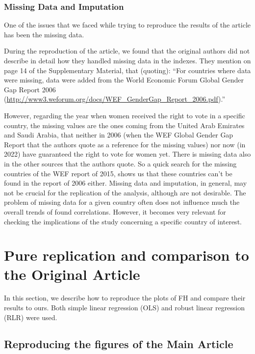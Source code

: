 \documentclass[
]{article}
\begin{document}
\hypertarget{missing-data-and-imputation}{%
\subsubsection{Missing Data and
Imputation}\label{missing-data-and-imputation}}

One of the issues that we faced while trying to reproduce the results of
the article has been the missing data.

During the reproduction of the article, we found that the original
authors did not describe in detail how they handled missing data in the
indexes. They mention on page 14 of the Supplementary Material, that
(quoting): ``For countries where data were missing, data were added from
the World Economic Forum Global Gender Gap Report 2006
(\url{http://www3.weforum.org/docs/WEF_GenderGap_Report_2006.pdf}).''

However, regarding the year when women received the right to vote in a
specific country, the missing values are the ones coming from the United
Arab Emirates and Saudi Arabia, that neither in 2006 (when the WEF
Global Gender Gap Report that the authors quote as a reference for the
missing values) nor now (in 2022) have guaranteed the right to vote for
women yet. There is missing data also in the other sources that the
authors quote. So a quick search for the missing countries of the WEF
report of 2015, shows us that these countries can't be found in the
report of 2006 either. Missing data and imputation, in general, may not
be crucial for the replication of the analysis, although are not
desirable. The problem of missing data for a given country often does
not influence much the overall trends of found correlations. However, it
becomes very relevant for checking the implications of the study
concerning a specific country of interest.

\hypertarget{pure-replication-and-comparison-to-the-original-article}{%
\section{Pure replication and comparison to the Original
Article}\label{pure-replication-and-comparison-to-the-original-article}}

In this section, we describe how to reproduce the plots of FH and
compare their results to ours. Both simple linear regression (OLS) and
robust linear regression (RLR) were used.

\hypertarget{reproducing-the-figures-of-the-main-article}{%
\subsection{Reproducing the figures of the Main
Article}\label{reproducing-the-figures-of-the-main-article}}
\end{document}
